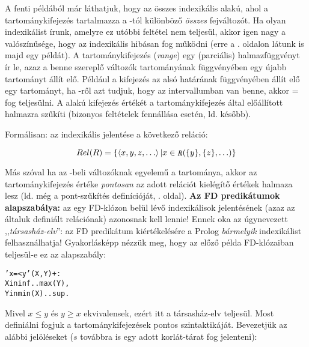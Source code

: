 A fenti példából már láthatjuk, hogy az összes indexikális  alakú, ahol a  tartománykifejezés tartalmazza a
-tól különböző \emph{összes} fejváltozót. Ha olyan indexikálist
írunk, amelyre ez utóbbi feltétel nem teljesül, akkor igen nagy a valószínűsége,
hogy az indexikális hibásan fog működni (erre a \pageref{hibas_indexikalis}. oldalon
látunk is majd egy példát). A  tartománykifejezés (\emph{range})
egy (parciális) halmazfüggvényt ír le, azaz a benne szereplő változók tartományának
függvényében egy újabb tartományt állít elő. Például a  kifejezés
az  alsó határának függvényében állít elő egy tartományt, ha -ről azt
tudjuk, hogy az  intervallumban van benne, akkor  = 
fog teljesülni. A  alakú kifejezés 
értékét a  tartománykifejezés által előállított halmazra szűkíti (bizonyos
feltételek fennállása esetén, ld. később).

Formálisan: az  indexikális jelentése a következő
reláció:

\[
Rel(R) =  \{ \tuple{x,y,z, \ldots} | x \in \parbox{0.6em}{\tt\em R}(\{y\},\{z\}, \ldots)\}
\]

Más szóval ha az -beli változóknak egyelemű a tartománya, akkor az
 tartománykifejezés értéke \emph{pontosan} az adott relációt kielégítő 
értékek halmaza lesz (ld. még a pont-szűkítés definícióját, \pageref{pontszukites}. oldal).
\br
{\bf Az FD predikátumok alapszabálya:} az egy FD-klózon belül lévő indexikálisok
jelentésének (azaz az általuk definiált relációnak) azonosnak kell lennie! Ennek oka
az úgynevezett ,,\emph{társasház-elv}'': az FD predikátum kiértékelésére a Prolog
\emph{bármelyik} indexikálist felhasználhatja! Gyakorlásképp nézzük meg, hogy az előző
példa FD-klózaiban teljesül-e ez az alapszabály:

\begin{alltt}
'x=<y'(X, Y) +:
    X in inf..max(Y), % \(\{\tuple{x,y}|x\in{}\cd{inf..max(\{}y\cd{\})}\} \equiv \{\tuple{x,y}|x\in{}(-\infty,y]\} \equiv \{\tuple{x,y}|x\leq{}y\}\)
    Y in min(X)..sup. % \(\{\tuple{x,y}|y\in{}\cd{min(\{}x\cd{\})..sup}\} \equiv \{\tuple{x,y}|y\in{}[x,+\infty)\} \equiv \{\tuple{x,y}|y\geq{}x\}\)
\end{alltt}

Mivel $x \leq y$ és $y \geq x$ ekvivalensek, ezért itt a társasház-elv teljesül.
\br
Most definiálni fogjuk a tartománykifejezések pontos szintaktikáját. Bevezetjük az
alábbi jelöléseket ($s$ továbbra is egy adott korlát-tárat fog jelenteni):

